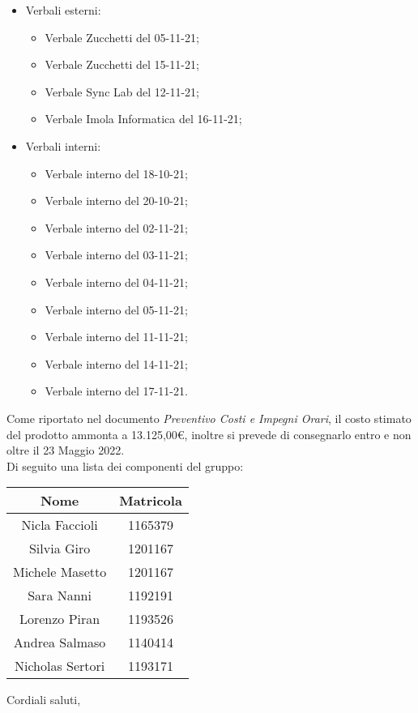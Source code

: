 \documentclass[11pt]{letter}
\begin{document}
\begin{letter}{}
\begin{itemize}
			\item Verbali esterni:
			\begin{itemize}
				\item Verbale Zucchetti del 05-11-21;
				\item Verbale Zucchetti del 15-11-21;
				\item Verbale Sync Lab del 12-11-21;
				\item Verbale Imola Informatica del 16-11-21;
			\end{itemize}
			\item Verbali interni:
			\begin{itemize}
				\item Verbale interno del 18-10-21;
				\item Verbale interno del 20-10-21;
				\item Verbale interno del 02-11-21;
				\item Verbale interno del 03-11-21;
				\item Verbale interno del 04-11-21;
				\item Verbale interno del 05-11-21;
				\item Verbale interno del 11-11-21;
				\item Verbale interno del 14-11-21;
				\item Verbale interno del 17-11-21.
			\end{itemize}
		\end{itemize}
		Come riportato nel documento \textit{Preventivo Costi e Impegni Orari}, il costo stimato del prodotto ammonta a 13.125,00\euro,
		inoltre si prevede di consegnarlo entro e non oltre il 23 Maggio 2022. \\
		Di seguito una lista dei componenti del gruppo: \\
		\begin{center}
			\begin{tabular}{ c | c }
				\textbf{Nome} & \textbf{Matricola} \\
				\hline Nicla Faccioli & 1165379 \\
				Silvia Giro & 1201167 \\
				Michele Masetto & 1201167 \\
				Sara Nanni & 1192191 \\
				Lorenzo Piran & 1193526 \\
				Andrea Salmaso & 1140414 \\
				Nicholas Sertori & 1193171 \\		
			\end{tabular}
		\end{center}
		\closing{Cordiali saluti,}
	\end{letter}
\end{document}
